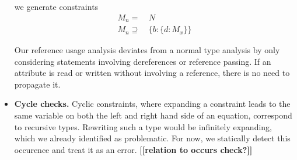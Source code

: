 \begin{itemize}
we generate constraints 
\begin{align*}
M_n = & ~ N \\
M_n \supseteq & ~ \{b: \{d: M_x \} \}
\end{align*}

Our reference usage analysis deviates from a normal type analysis by only considering statements involving dereferences or reference passing. If an attribute is read or written without involving a reference, there is no need to propagate it. 

\item \textbf{Cycle checks.}
Cyclic constraints, where expanding a constraint leads to the same variable on both the left and right hand side of an equation, correspond to recursive types. Rewriting such a type would be infinitely expanding, which we already identified as problematic. For now, we statically detect this occurence and treat it as an error. \textbf{[[relation to occurs check?]]}
\end{itemize}
